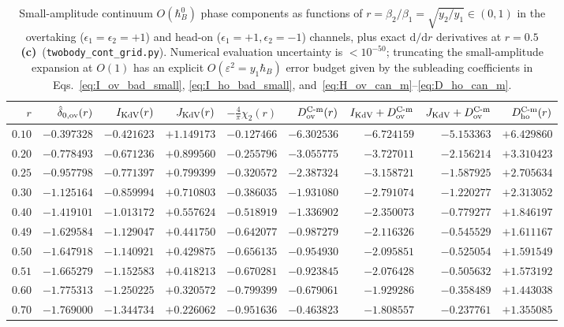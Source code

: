 \documentclass[11pt,a4paper]{article}
\newcommand{\Lc}{\textbf{(c)}}
\newcommand{\script}[1]{\texttt{#1}}
\newcommand{\dd}{\mathrm{d}}
\begin{document}
\begin{table}[htbp]
\centering
\caption{Small-amplitude continuum $O(\hbar_B^0)$ phase components as functions of $r=\beta_2/\beta_1=\sqrt{y_2/y_1}\in(0,1)$ in the overtaking ($\epsilon_1=\epsilon_2=+1$) and head-on ($\epsilon_1=+1,\epsilon_2=-1$) channels, plus exact $\dd/\dd r$ derivatives at $r=0.5$ \Lc\ (\script{twobody\_cont\_grid.py}). Numerical evaluation uncertainty is $<10^{-50}$; truncating the small-amplitude expansion at $O(1)$ has an explicit $O(\varepsilon^2=y_1\hbar_B)$ error budget given by the subleading coefficients in Eqs.~\eqref{eq:I_ov_bad_small}, \eqref{eq:I_ho_bad_small}, and~\eqref{eq:H_ov_can_m}--\eqref{eq:D_ho_can_m}.}
\label{tab:ratio_grid}
\medskip
\small
\begin{tabular}{@{}rrrrrrrrr@{}}
\toprule
$r$ & $\hat\delta_{0,\rm ov}(r)$ & $I_{\rm KdV}(r)$ & $J_{\rm KdV}(r)$ & $-\frac{4}{\pi}\chi_2(r)$ & $D_{\rm ov}^{\rm C\text{-m}}(r)$ & $I_{\rm KdV}+D_{\rm ov}^{\rm C\text{-m}}$ & $J_{\rm KdV}+D_{\rm ov}^{\rm C\text{-m}}$ & $D_{\rm ho}^{\rm C\text{-m}}(r)$ \\
\midrule
$0.10$ & $-0.397328$ & $-0.421623$ & $+1.149173$ & $-0.127466$ & $-6.302536$ & $-6.724159$ & $-5.153363$ & $+6.429860$ \\
$0.20$ & $-0.778493$ & $-0.671236$ & $+0.899560$ & $-0.255796$ & $-3.055775$ & $-3.727011$ & $-2.156214$ & $+3.310423$ \\
$0.25$ & $-0.957798$ & $-0.771397$ & $+0.799399$ & $-0.320572$ & $-2.387324$ & $-3.158721$ & $-1.587925$ & $+2.705634$ \\
$0.30$ & $-1.125164$ & $-0.859994$ & $+0.710803$ & $-0.386035$ & $-1.931080$ & $-2.791074$ & $-1.220277$ & $+2.313052$ \\
$0.40$ & $-1.419101$ & $-1.013172$ & $+0.557624$ & $-0.518919$ & $-1.336902$ & $-2.350073$ & $-0.779277$ & $+1.846197$ \\
$0.49$ & $-1.629584$ & $-1.129047$ & $+0.441750$ & $-0.642077$ & $-0.987279$ & $-2.116326$ & $-0.545529$ & $+1.611167$ \\
$0.50$ & $-1.647918$ & $-1.140921$ & $+0.429875$ & $-0.656135$ & $-0.954930$ & $-2.095851$ & $-0.525054$ & $+1.591549$ \\
$0.51$ & $-1.665279$ & $-1.152583$ & $+0.418213$ & $-0.670281$ & $-0.923845$ & $-2.076428$ & $-0.505632$ & $+1.573192$ \\
$0.60$ & $-1.775313$ & $-1.250225$ & $+0.320572$ & $-0.799399$ & $-0.679061$ & $-1.929286$ & $-0.358489$ & $+1.443038$ \\
$0.70$ & $-1.769000$ & $-1.344734$ & $+0.226062$ & $-0.951636$ & $-0.463823$ & $-1.808557$ & $-0.237761$ & $+1.355085$ \\

\end{tabular}
\end{table}
\end{document}
